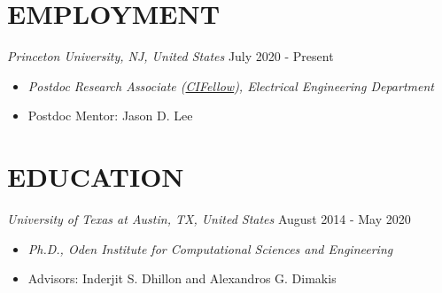 \documentclass[margin, 10pt]{res} %
\begin{document}
\begin{resume}

 






\section{EMPLOYMENT}
  {\sl Princeton University, NJ, United States} \hfill July 2020 - Present
  \begin{itemize}
    \item {\sl Postdoc Research Associate (\href{https://cifellows2020.org/}{CIFellow}), Electrical Engineering Department }
    \item Postdoc Mentor: Jason D. Lee
  \end{itemize}


\section{EDUCATION}
{\sl University of Texas at Austin, TX, United States} \hfill August 2014 - May 2020
\begin{itemize}
\item {\sl Ph.D., Oden Institute for Computational Sciences and Engineering} 
\item Advisors: Inderjit S. Dhillon and Alexandros 
  G. Dimakis  
\end{itemize} 




\end{resume}
\end{document}
